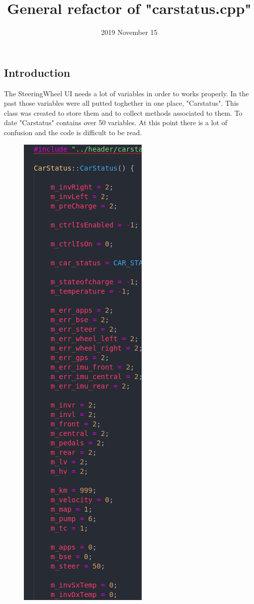 \documentclass[12pt, letterpaper]{article}
\title{General refactor of "carstatus.cpp"}
\date{2019 November 15}
\begin{document}
\begin{titlepage}
\maketitle
\end{titlepage}

\begin{flushleft}

\section{Introduction}
	The SteeringWheel UI needs a lot of variables in order to works properly. In the past those variables were all putted toghether in one place, "Carstatus". This class was created to store them and to collect methods associated to them. To date "Carstatus" contains over 50 variables. At this point there is a lot of confusion and the code is difficult to be read.
\newline
\newline
\begin{figure}[h]
    \centering
    \includegraphics[scale=1.5]{code.png}

\end{figure}
\end{flushleft}
\end{document}

